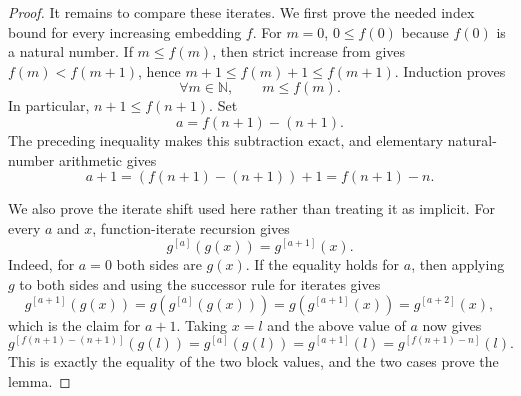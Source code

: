 \begin{proof}
It remains to compare these iterates.  We first prove the needed index
bound for every increasing embedding $f$.  For $m=0$, $0\leq f(0)$ because
$f(0)$ is a natural number.  If $m\leq f(m)$, then strict increase from
 gives $f(m)<f(m+1)$, hence
$m+1\leq f(m)+1\leq f(m+1)$.  Induction proves
\[
\forall m\in\mathbb N,\qquad m\leq f(m).
\]
In particular, $n+1\leq f(n+1)$.  Set
\[
a=f(n+1)-(n+1).
\]
The preceding inequality makes this subtraction exact, and elementary
natural-number arithmetic gives
\[
a+1=(f(n+1)-(n+1))+1=f(n+1)-n.
\]

We also prove the iterate shift used here rather than treating it as
implicit.  For every $a$ and $x$, function-iterate recursion gives
\[
g^{[a]}(g(x))=g^{[a+1]}(x).
\]
Indeed, for $a=0$ both sides are $g(x)$.  If the equality holds for $a$,
then applying $g$ to both sides and using the successor rule for iterates
gives
\[
g^{[a+1]}(g(x))
=g(g^{[a]}(g(x)))
=g(g^{[a+1]}(x))
=g^{[a+2]}(x),
\]
which is the claim for $a+1$.  Taking $x=l$ and the above value of $a$ now
gives
\[
g^{[f(n+1)-(n+1)]}(g(l))
=g^{[a]}(g(l))
=g^{[a+1]}(l)
=g^{[f(n+1)-n]}(l).
\]
This is exactly the equality of the two block values, and the two cases
prove the lemma.
\end{proof}
